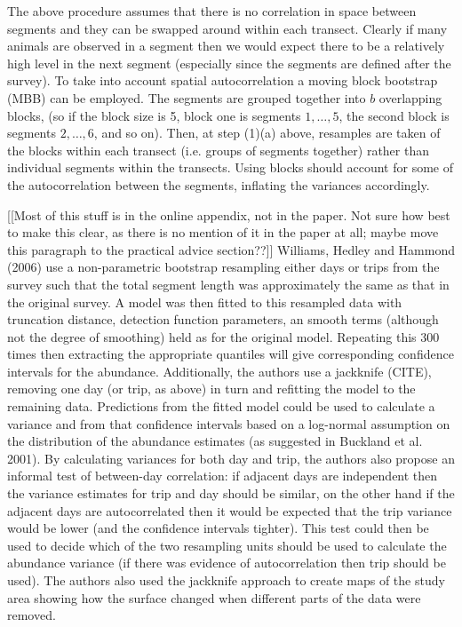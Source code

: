 \documentclass[useAMS,referee]{biom}
\begin{document}
The above procedure assumes that there is no correlation in space between segments and they can be swapped around within each transect. Clearly if many animals are observed in a segment then we would expect there to be a relatively high level in the next segment (especially since the segments are defined after the survey). To take into account spatial autocorrelation a moving block bootstrap (MBB) can be employed. The segments are grouped together into $b$ overlapping blocks, (so if the block size is 5, block one is segments $1,\ldots,5$, the second block is segments $2,\ldots,6$, and so on). Then, at step (1)(a) above, resamples are taken of the blocks within each transect (i.e. groups of segments together) rather than individual segments within the transects. Using blocks should account for some of the autocorrelation between the segments, inflating the variances accordingly.


[[Most of this stuff is in the online appendix, not in the paper. Not sure how best to make this clear, as there is no mention of it in the paper at all; maybe move this paragraph to the practical advice section??]] 
Williams, Hedley and Hammond (2006) use a non-parametric bootstrap resampling either days or trips from the survey such that the total segment length was approximately the same as that in the original survey. A model was then fitted to this resampled data with truncation distance, detection function parameters, an smooth terms (although not the degree of smoothing) held as for the original model. Repeating this 300 times then extracting the appropriate quantiles will give corresponding confidence intervals for the abundance. Additionally, the authors use a jackknife (CITE), removing one day (or trip, as above) in turn and refitting the model to the remaining data. Predictions from the fitted model could be used to calculate a variance and from that confidence intervals based on a log-normal assumption on the distribution of the abundance estimates (as suggested in Buckland et al. 2001). By calculating variances for both day and trip, the authors also propose an informal test of between-day correlation: if adjacent days are independent then the variance estimates for trip and day should be similar, on the other hand if the adjacent days are autocorrelated then it would be expected that the trip variance would be lower (and the confidence intervals tighter). This test could then be used to decide which of the two resampling units should be used to calculate the abundance variance (if there was evidence of autocorrelation then trip should be used). The authors also used the jackknife approach to create maps of the study area showing how the surface changed when different parts of the data were removed.
\end{document}
